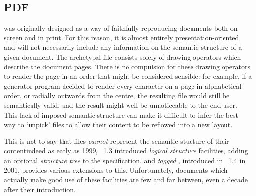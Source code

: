 \subsection{PDF}
\pdf{} was originally designed as a way of faithfully reproducing documents both on screen and in
print. For this reason, it is almost entirely pre\-s\-en\-ta\-tion-oriented and will not necessarily
include any information on the semantic structure of a given document. The archetypal \pdf{}
file consists solely of drawing operators which describe the document pages. There is no
compulsion for these drawing operators to render the page in an order that might be considered
sensible: for example, if a \pdf{} generator program decided to render every character on a page in
alphabetical order, or radially outwards from the centre, the resulting file would still be
semantically valid, and the result might well be unnoticeable to the end user. This lack of imposed
semantic structure can make it difficult to infer the best way to `unpick' \pdf{} files to allow
their content to be reflowed into a new layout.

This is not to say that \pdf{} files \emph{cannot} represent the semantic stucture of their
content\ed indeed as early as 1999, \pdf{}~1.3 introduced \emph{logical structure}
facilities\cite{Adobe2001}, adding an optional \emph{structure tree} to the \pdf{} specification,
and \emph{tagged \pdf{}}, introduced in \pdf{}~1.4 in 2001, provides various extensions to this.
Unfortunately, \pdf{} documents which actually make good use of these facilities are few and far
between, even a decade after their introduction.


